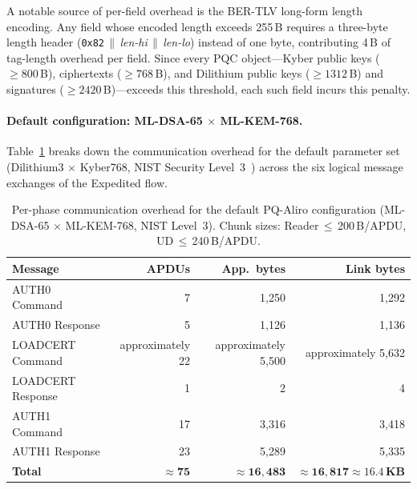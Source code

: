 \documentclass[runningheads]{llncs}
\begin{document}
A notable source of per-field overhead is the BER-TLV long-form length
encoding.  Any field whose encoded length exceeds 255\,B requires a
three-byte length header (\texttt{0x82}\,$\|$\,\textit{len-hi}\,$\|$\,\textit{len-lo})
instead of one byte, contributing 4\,B of tag-length overhead per field.
Since every PQC object—Kyber public keys ($\ge 800$\,B), ciphertexts
($\ge 768$\,B), and Dilithium public keys ($\ge 1312$\,B) and signatures
($\ge 2420$\,B)—exceeds this threshold, each such field incurs this
penalty.

\paragraph{Default configuration: ML-DSA-65 $\times$ ML-KEM-768.}
Table~\ref{tab:overhead_default} breaks down the communication overhead for
the default parameter set (Dilithium3 $\times$ Kyber768, NIST Security
Level~3~\cite{NIST:FIPS203,NIST:FIPS204}) across the six logical
message exchanges of the Expedited flow.

\begin{table}[t]
\centering
\caption{Per-phase communication overhead for the default PQ-Aliro
configuration (ML-DSA-65 $\times$ ML-KEM-768, NIST Level~3).
Chunk sizes: Reader\,$\le$\,200\,B/APDU, UD\,$\le$\,240\,B/APDU.}
\label{tab:overhead_default}
\begin{tabular}{lrrr}
\hline
\textbf{Message} & \textbf{APDUs} & \textbf{App.\ bytes} & \textbf{Link bytes} \\
\hline
AUTH0 Command   &  7   & 1{,}250   & 1{,}292   \\
AUTH0 Response  &  5   & 1{,}126   & 1{,}136   \\
LOADCERT Command & approximately 22 & approximately 5{,}500 & approximately 5{,}632 \\
LOADCERT Response &  1  &       2   &       4   \\
AUTH1 Command   & 17   & 3{,}316   & 3{,}418   \\
AUTH1 Response  & 23   & 5{,}289   & 5{,}335   \\
\hline
\textbf{Total}  & $\mathbf{\approx 75}$ & $\mathbf{\approx 16{,}483}$ & $\mathbf{\approx 16{,}817 \approx 16.4\,KB}$ \\
\hline
\end{tabular}
\end{table}
\end{document}
